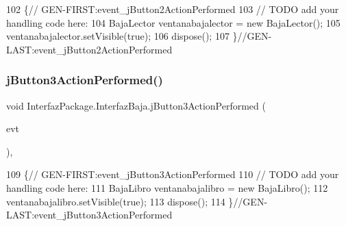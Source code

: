 \begin{DoxyCode}
102                                                                          \{\textcolor{comment}{//
      GEN-FIRST:event\_jButton2ActionPerformed}
103         \textcolor{comment}{// TODO add your handling code here:}
104         BajaLector ventanabajalector = \textcolor{keyword}{new} BajaLector();
105         ventanabajalector.setVisible(\textcolor{keyword}{true});
106         dispose();
107     \}\textcolor{comment}{//GEN-LAST:event\_jButton2ActionPerformed}
\end{DoxyCode}
\mbox{\label{class_interfaz_package_1_1_interfaz_baja_adfecaa97fbf001fd74893adda16c8d9b}} 
\subsubsection{\texorpdfstring{j\+Button3\+Action\+Performed()}{jButton3ActionPerformed()}}
{\footnotesize\ttfamily void Interfaz\+Package.\+Interfaz\+Baja.\+j\+Button3\+Action\+Performed (\begin{DoxyParamCaption}\item[{java.\+awt.\+event.\+Action\+Event}]{evt }\end{DoxyParamCaption})\hspace{0.3cm}{\ttfamily [inline]}, {\ttfamily [private]}}


\begin{DoxyCode}
109                                                                          \{\textcolor{comment}{//
      GEN-FIRST:event\_jButton3ActionPerformed}
110         \textcolor{comment}{// TODO add your handling code here:}
111         BajaLibro ventanabajalibro = \textcolor{keyword}{new} BajaLibro();
112         ventanabajalibro.setVisible(\textcolor{keyword}{true});
113         dispose();
114     \}\textcolor{comment}{//GEN-LAST:event\_jButton3ActionPerformed}
\end{DoxyCode}
\mbox{\label{class_interfaz_package_1_1_interfaz_baja_ae62b4b45f031099df42c18284921433e}} 
